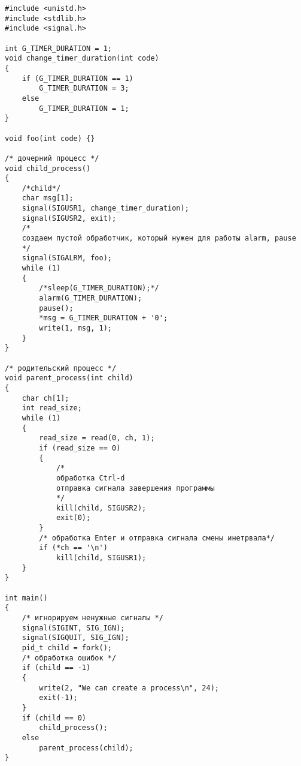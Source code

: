 \begin{verbatim}
#include <unistd.h>
#include <stdlib.h>
#include <signal.h>

int G_TIMER_DURATION = 1;
void change_timer_duration(int code)
{
    if (G_TIMER_DURATION == 1)
        G_TIMER_DURATION = 3;
    else
        G_TIMER_DURATION = 1;
}

void foo(int code) {}

/* дочерний процесс */
void child_process()
{
    /*child*/
    char msg[1];
    signal(SIGUSR1, change_timer_duration);
    signal(SIGUSR2, exit);
	/*
	создаем пустой обработчик, который нужен для работы alarm, pause
	*/
    signal(SIGALRM, foo);
    while (1)
    {
        /*sleep(G_TIMER_DURATION);*/
        alarm(G_TIMER_DURATION);
        pause();
        *msg = G_TIMER_DURATION + '0';
        write(1, msg, 1);
    }
}

/* родительский процесс */
void parent_process(int child)
{
    char ch[1];
    int read_size;
    while (1)
    {
        read_size = read(0, ch, 1);
        if (read_size == 0)
        {
            /*
            обработка Ctrl-d
            отправка сигнала завершения программы
            */
            kill(child, SIGUSR2);
            exit(0);
        }
        /* обработка Enter и отправка сигнала смены инетрвала*/
        if (*ch == '\n')
            kill(child, SIGUSR1);
    }
}

int main()
{
    /* игнорируем ненужные сигналы */
    signal(SIGINT, SIG_IGN);
    signal(SIGQUIT, SIG_IGN);
    pid_t child = fork();
    /* обработка ошибок */
    if (child == -1)
    {
        write(2, "We can create a process\n", 24);
        exit(-1);
    }
    if (child == 0)
        child_process();
    else
        parent_process(child);
}
\end{verbatim}
